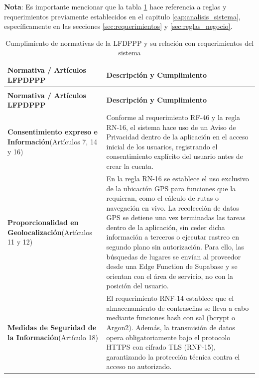\textbf{Nota}: Es importante mencionar que la tabla \ref{tab:LFPDPPP} hace referencia a reglas y requerimientos previamente establecidos en el capitulo \ref{cap:analisis_sistema}, específicamente en las secciones \ref{sec:requerimientos} y \ref{sec:reglas_negocio}.

\begin{longtable}{|>{\raggedright\arraybackslash}p{}|>{\raggedright\arraybackslash}p{}|}
\caption{Cumplimiento de normativas de la LFDPPP y su relación con requerimientos del sistema}\label{tab:LFPDPPP} \\
\hline
\textbf{\centering Normativa / Artículos LFPDPPP} & \textbf{\centering Descripción y Cumplimiento} \\ \hline
\endfirsthead
\multicolumn{2}{c}{\bfseries Continuación de la Tabla \thetable} \\
\hline
\textbf{\centering Normativa / Artículos LFPDPPP} & \textbf{\centering Descripción y Cumplimiento} \\ \hline
\endhead
\textbf{Consentimiento expreso e Información}\newline (Artículos 7, 14 y 16) & Conforme al requerimiento RF-46 y la regla RN-16, el sistema hace uso de un Aviso de Privacidad dentro de la aplicación en el acceso inicial de los usuarios, registrando el consentimiento explícito del usuario antes de crear la cuenta. \\ \hline

\textbf{Proporcionalidad en Geolocalización}\newline (Artículos 11 y 12) & En la regla RN-16 se establece el uso exclusivo de la ubicación GPS para funciones que la requieran, como el cálculo de rutas o navegación en vivo. La recolección de datos GPS se detiene una vez terminadas las tareas dentro de la aplicación, sin ceder dicha información a terceros o ejecutar rastreo en segundo plano sin autorización. Para ello, las búsquedas de lugares se envían al proveedor desde una Edge Function de Supabase y se orientan con el área de servicio, no con la posición del usuario. \\ \hline
\textbf{Medidas de Seguridad de la Información}\newline (Artículo 18) & El requerimiento RNF-14 establece que el almacenamiento de contraseñas se lleva a cabo mediante funciones hash con sal (bcrypt o Argon2). Además, la transmisión de datos opera obligatoriamente bajo el protocolo HTTPS con cifrado TLS (RNF-15), garantizando la protección técnica contra el acceso no autorizado. \\ \hline


\end{longtable}
